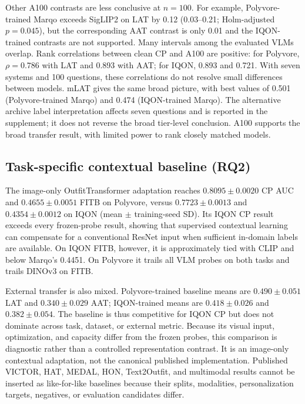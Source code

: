 \documentclass[preprint,12pt]{elsarticle}
\begin{document}
Other A100 contrasts are less conclusive at $n=100$. For example, Polyvore-trained Marqo exceeds SigLIP2 on LAT by 0.12 (0.03--0.21; Holm-adjusted $p=0.045$), but the corresponding AAT contrast is only 0.01 and the IQON-trained contrasts are not supported. Many intervals among the evaluated VLMs overlap. Rank correlations between clean CP and A100 are positive: for Polyvore, $\rho=0.786$ with LAT and 0.893 with AAT; for IQON, 0.893 and 0.721. With seven systems and 100 questions, these correlations do not resolve small differences between models. mLAT gives the same broad picture, with best values of 0.501 (Polyvore-trained Marqo) and 0.474 (IQON-trained Marqo). The alternative archive label interpretation affects seven questions and is reported in the supplement; it does not reverse the broad tier-level conclusion. A100 supports the broad transfer result, with limited power to rank closely matched models.

\subsection{Task-specific contextual baseline (RQ2)}\label{sec:baseline}

The image-only OutfitTransformer adaptation reaches $0.8095\pm0.0020$ CP AUC and $0.4655\pm0.0051$ FITB on Polyvore, versus $0.7723\pm0.0013$ and $0.4354\pm0.0012$ on IQON (mean $\pm$ training-seed SD). Its IQON CP result exceeds every frozen-probe result, showing that supervised contextual learning can compensate for a conventional ResNet input when sufficient in-domain labels are available. On IQON FITB, however, it is approximately tied with CLIP and below Marqo's 0.4451. On Polyvore it trails all VLM probes on both tasks and trails DINOv3 on FITB.

External transfer is also mixed. Polyvore-trained baseline means are $0.490\pm0.051$ LAT and $0.340\pm0.029$ AAT; IQON-trained means are $0.418\pm0.026$ and $0.382\pm0.054$. The baseline is thus competitive for IQON CP but does not dominate across task, dataset, or external metric. Because its visual input, optimization, and capacity differ from the frozen probes, this comparison is diagnostic rather than a controlled representation contrast. It is an image-only contextual adaptation, not the canonical published implementation. Published VICTOR, HAT, MEDAL, HON, Text2Outfit, and multimodal results cannot be inserted as like-for-like baselines because their splits, modalities, personalization targets, negatives, or evaluation candidates differ.
\end{document}
